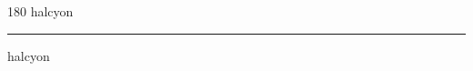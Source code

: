
\begin{frame}
\begin{center}
\begin{turn}{180}
{\fontsize{2.5cm}{1em}\selectfont halcyon}
\end{turn}
\vspace{1em}\par  
\hrule
\vspace{1em}\par  
{\fontsize{2.5cm}{1em}\selectfont halcyon}
\end{center}
\end{frame}
